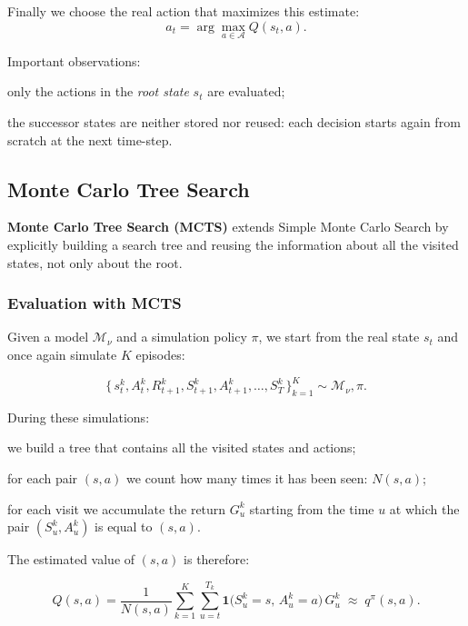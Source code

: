 Finally we choose the real action that maximizes this estimate:
\[
a_t = \arg\max_{a \in \mathcal{A}} Q(s_t,a).
\]

Important observations:

\begin{compactitemize}
    \item only the actions in the \emph{root state} $s_t$ are evaluated;
    \item the successor states are neither stored nor reused: each decision
          starts again from scratch at the next time-step.
\end{compactitemize}

\subsection{Monte Carlo Tree Search}

\textbf{Monte Carlo Tree Search (MCTS)} extends Simple Monte Carlo Search
by explicitly building a search tree and reusing the information
about all the visited states, not only about the root.

\subsubsection{Evaluation with MCTS}

Given a model $\mathcal{M}_\nu$ and a simulation policy $\pi$, we start from the
real state $s_t$ and once again simulate $K$ episodes:

\[
\bigl\{\, s_t^k, A_t^k, R_{t+1}^k, S_{t+1}^k, A_{t+1}^k, \dots, S_T^k \,\bigr\}_{k=1}^K
\sim \mathcal{M}_\nu, \pi.
\]

During these simulations:
\begin{compactitemize}
    \item we build a tree that contains all the visited states and actions;
    \item for each pair $(s,a)$ we count how many times it has been seen:
          $N(s,a)$;
    \item for each visit we accumulate the return $G_u^k$ starting from the time $u$
          at which the pair $(S_u^k, A_u^k)$ is equal to $(s,a)$.
\end{compactitemize}

The estimated value of $(s,a)$ is therefore:

\[
Q(s,a)
=
\frac{1}{N(s,a)}
\sum_{k=1}^{K}
\sum_{u=t}^{T_k}
\mathbf{1}\bigl( S_u^k = s,\, A_u^k = a \bigr)\, G_u^k
\;\approx\;
q^\pi(s,a).
\]

